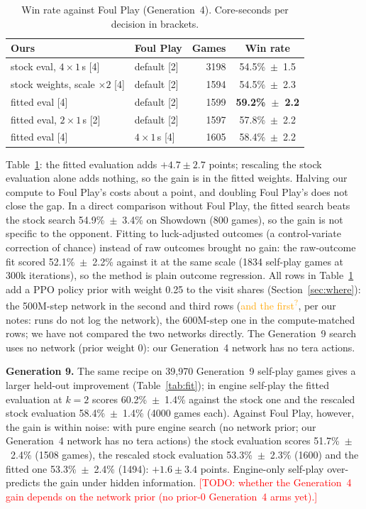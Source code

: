 \documentclass[conference]{IEEEtran}
\newcommand{\todo}[1]{\textcolor{red}{[TODO: #1]}}
\newcommand{\verify}[1]{\textcolor{orange}{#1\textsuperscript{?}}}
\begin{document}
\begin{table}[t]\centering\caption{Win rate against Foul Play (Generation~4). Core-seconds per decision in
brackets.}\label{tab:fp}
\begin{tabular}{llrc}\toprule
Ours & Foul Play & Games & Win rate\\\midrule
stock eval, $4{\times}1$\,s [4] & default [2] & 3198 & 54.5\%~$\pm$~1.5\\
stock weights, scale $\times2$ [4] & default [2] & 1594 & 54.5\%~$\pm$~2.3\\
fitted eval [4] & default [2] & 1599 & \textbf{59.2\%~$\pm$~2.2}\\
fitted eval, $2{\times}1$\,s [2] & default [2] & 1597 & 57.8\%~$\pm$~2.2\\
fitted eval [4] & $4{\times}1$\,s [4] & 1605 & 58.4\%~$\pm$~2.2\\\bottomrule
\end{tabular}\end{table}

Table~\ref{tab:fp}: the fitted evaluation adds $+4.7\pm2.7$ points; rescaling the stock evaluation alone adds
nothing, so the gain is in the fitted weights. Halving our compute to Foul Play's costs about a point, and doubling
Foul Play's does not close the gap. In a direct comparison without Foul Play, the fitted search beats the stock
search 54.9\%~$\pm$~3.4\% on Showdown (800 games), so the gain is not specific to the opponent. Fitting to
luck-adjusted outcomes (a control-variate correction of chance) instead of raw outcomes brought no gain: the
raw-outcome fit scored 52.1\%~$\pm$~2.2\% against it at the same scale (1834 self-play games at 300k
iterations), so the method is plain outcome regression.
All rows in Table~\ref{tab:fp} add a PPO policy prior with weight 0.25 to the visit shares (Section~\ref{sec:where}):
the 500M-step network in the second and third rows (\verify{and the first}, per our notes: runs do not log the
network), the 600M-step one in the compute-matched rows; we have not compared the two networks directly. The Generation~9 search uses no network (prior weight 0): our Generation~4 network has no tera actions.

\textbf{Generation 9.} The same recipe on 39{,}970 Generation~9 self-play games gives a larger held-out
improvement (Table~\ref{tab:fit}); in engine self-play the fitted evaluation at $k{=}2$ scores
60.2\%~$\pm$~1.4\% against the stock one and the rescaled stock evaluation 58.4\%~$\pm$~1.4\% (4000 games each).
Against Foul Play, however, the gain is within noise: with pure engine search (no network prior; our Generation~4 network has
no tera actions) the stock evaluation scores 51.7\%~$\pm$~2.4\% (1508 games), the rescaled stock evaluation
53.3\%~$\pm$~2.3\% (1600) and the fitted one 53.3\%~$\pm$~2.4\% (1494): $+1.6\pm3.4$ points. Engine-only
self-play over-predicts the gain under hidden information. \todo{whether the Generation~4 gain depends on the
network prior (no prior-0 Generation~4 arms yet).}
\end{document}
